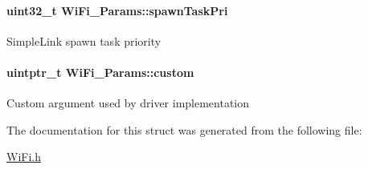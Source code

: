 \paragraph[{spawn\+Task\+Pri}]{\setlength{\rightskip}{0pt plus 5cm}uint32\+\_\+t Wi\+Fi\+\_\+\+Params\+::spawn\+Task\+Pri}\label{struct_wi_fi___params_a94ad7c8da2b1cdca8c541d727acc3be1}
Simple\+Link spawn task priority 
\paragraph[{custom}]{\setlength{\rightskip}{0pt plus 5cm}uintptr\+\_\+t Wi\+Fi\+\_\+\+Params\+::custom}\label{struct_wi_fi___params_a1dd49efc509d400025dc223945611737}
Custom argument used by driver implementation 

The documentation for this struct was generated from the following file\+:\begin{DoxyCompactItemize}
\item 
\hyperlink{_wi_fi_8h}{Wi\+Fi.\+h}\end{DoxyCompactItemize}
